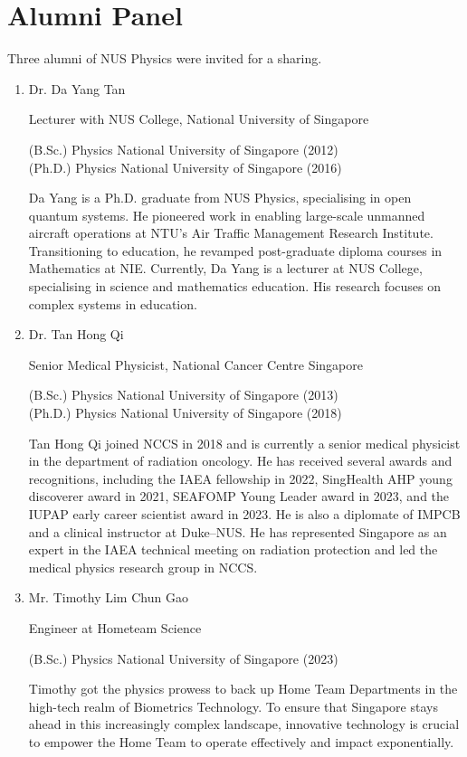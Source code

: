 \documentclass[12pt,a4paper]{article}
\begin{document}
\pagebreak

\section{Alumni Panel}
Three alumni of NUS Physics were invited for a sharing.

\begin{enumerate}
\item Dr. Da Yang Tan

Lecturer with NUS College, National University of Singapore

(B.Sc.) Physics National University of Singapore (2012) \\
(Ph.D.) Physics National University of Singapore (2016)

Da Yang is a Ph.D. graduate from NUS Physics, specialising in open quantum systems. He pioneered work in enabling large-scale unmanned aircraft operations at NTU's Air Traffic Management Research Institute. Transitioning to education, he revamped post-graduate diploma courses in Mathematics at NIE. Currently, Da Yang is a lecturer at NUS College, specialising in science and mathematics education. His research focuses on complex systems in education.

\item Dr. Tan Hong Qi

Senior Medical Physicist, National Cancer Centre Singapore

(B.Sc.) Physics National University of Singapore (2013) \\
(Ph.D.) Physics National University of Singapore (2018)

Tan Hong Qi joined NCCS in 2018 and is currently a senior medical physicist in the department of radiation oncology. He has received several awards and recognitions, including the IAEA fellowship in 2022, SingHealth AHP young discoverer award in 2021, SEAFOMP Young Leader award in 2023, and the IUPAP early career scientist award in 2023. He is also a diplomate of IMPCB and a clinical instructor at Duke--NUS. He has represented Singapore as an expert in the IAEA technical meeting on radiation protection and led the medical physics research group in NCCS.

\item Mr. Timothy Lim Chun Gao

Engineer at Hometeam Science

(B.Sc.) Physics National University of Singapore (2023)

Timothy got the physics prowess to back up Home Team Departments in the high-tech realm of Biometrics Technology. To ensure that Singapore stays ahead in this increasingly complex landscape, innovative technology is crucial to empower the Home Team to operate effectively and impact exponentially.
\end{enumerate}
\end{document}
